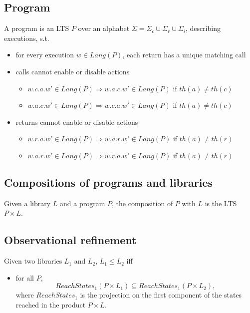 \subsection{Program}



A program is an LTS $P$ over an alphabet $\Sigma=\Sigma_c\cup \Sigma_r\cup \Sigma_i$, describing executions, s.t.
\begin{itemize}
	\item for every execution $w \in Lang(P)$, each return has a unique matching call
	\item calls cannot enable or disable actions %
	\begin{itemize}
		\item $w.c.a.w'\in Lang(P)\Rightarrow w.a.c.w'\in Lang(P)$ if $th(a) \neq th(c)$
		\item $w.a.c.w' \in Lang(P) \Rightarrow w.c.a.w'\in Lang(P)$ if $th(a) \neq th(c)$
    	\end{itemize}
	\item returns cannot enable or disable actions 
	\begin{itemize}
		\item $w.r.a.w'\in Lang(P)\Rightarrow w.a.r.w'\in Lang(P)$ if $th(a) \neq th(r)$
		\item $w.a.r.w'\in Lang(P) \Rightarrow w.r.a.w' \in Lang(P)$ if $th(a) \neq th(r)$
	\end{itemize}
\end{itemize}

\subsection{Compositions of programs and libraries}

Given a library $L$ and a program $P$, the composition of $P$ with $L$ is the LTS $P\times L$.

\subsection{Observational refinement}

Given two libraries $L_1$ and $L_2$, $L_1\leq L_2$ iff
\begin{itemize}
	\item for all $P$, 
	\[
	ReachStates_1(P\times L_1) \subseteq ReachStates_1(P\times L_2),
	\] 
	where $ReachStates_1$ is the projection on the first component of the states reached in the product $P\times L$.
\end{itemize}

